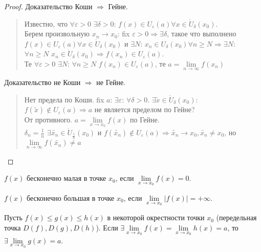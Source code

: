 \documentclass{article}
\begin{document}
	\begin{proof}
		Доказательство Коши $\Rightarrow$ Гейне.
		\begin{quote}
			Известно, что $\forall \varepsilon > 0$ $\exists \delta > 0$: $f(x) \in U_{\varepsilon}(a) \forall x \in \mathring{U}_{\delta}(x_0)$. \\
			Берем произвольную $x_n \rightarrow x_0$: fix $\varepsilon > 0 \Rightarrow \exists \delta$, такое что выполнено $f(x) \in U_{\varepsilon}(a) \forall x \in \mathring{U}_{\delta}(x_0)$ и $\exists N$: $x_n \in U_{\delta}(x_0) \forall n \geqslant N \Rightarrow \exists N$: $\forall n \geqslant N$ $x_n \in \mathring{U}_{\delta}(x_0) \Rightarrow f(x_n) \in U_{\varepsilon}(a)$. \\
			Те $\forall \varepsilon > 0$ $\exists N$: $\forall n \geqslant N$ $f(x_n) \in U_{\varepsilon}(a)$, те $a = \lim \limits_{n \rightarrow \infty}f(x_n)$
		\end{quote}
		Доказательство не Коши $\Rightarrow$ не Гейне.
		\begin{quote}
			Нет предела по Коши. fix $a$: $\exists \varepsilon$: $\forall \delta > 0$. $\exists \tilde{x} \in \mathring{U}_{\delta}(x_0)$: $f(\tilde{x}) \not\in U_{\varepsilon}(a) \Rightarrow a$ не является пределом по Гейне? \\
			От противного. $a = \lim \limits_{x \rightarrow x_0} f(x)$ по Гейне. \\
			$\delta_n = \frac{1}{n}$ $\exists \tilde{x_n} \in \mathring{U}_{\frac{1}{n}}(x_0)$ и $f(\tilde{x_n}) \not\in U_{\varepsilon}(a) \Rightarrow \tilde{x_n} \rightarrow x_0, \tilde{x_n} \not= x_0$, но $\lim \limits_{n \rightarrow \infty} f(\tilde{x_n}) \not= a$
		\end{quote}
	\end{proof}
	\noindent
	\begin{statement}
		$f(x)$ бесконечно малая в точке $x_0$, если $\lim \limits_{x \rightarrow x_0} f(x) = 0$.
	\end{statement}
	\begin{statement}
		$f(x)$ бесконечно большая в точке $x_0$, если $\lim \limits_{x \rightarrow x_0} |f(x)| = +\infty$.
	\end{statement}
	\begin{lemma}
		Пусть $f(x) \leqslant g(x) \leqslant h(x)$ в некоторой окрестности точки $x_0$ (передельная точка $D(f), D(g), D(h)$). Если $\exists \lim \limits_{x \rightarrow x_0} f(x) = \lim \limits_{x \rightarrow x_0} h(x) = a$, то $\exists \lim \limits_{x \rightarrow x_0} g(x) = a$.
	\end{lemma}
\end{document}
